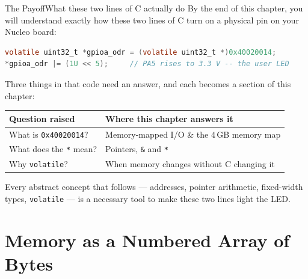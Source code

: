\documentclass[9pt,aspectratio=169,xcolor=table]{beamer}
\begin{document}
{\beamerextras
\begin{frame}[fragile]{The Payoff}{What these two lines of C actually do}
    \leavevmode
    By the end of this chapter, you will understand \alert{exactly} how these two lines of C turn on a physical pin on your Nucleo board:

    \vspace{3mm}
    \begin{center}
    \begin{minipage}{.92\textwidth}
\begin{lstlisting}[language=C, basicstyle=\ttfamily\small]
volatile uint32_t *gpioa_odr = (volatile uint32_t *)0x40020014;
*gpioa_odr |= (1U << 5);     // PA5 rises to 3.3 V -- the user LED
\end{lstlisting}
    \end{minipage}
    \end{center}

    \vspace{3mm}
    {\small Three things in that code need an answer, and each becomes a section of this chapter:}

    \vspace{1mm}
    \begin{center}
    {\small
    \striped
    \begin{tabular}{@{}l R{.56\textwidth}@{}}
        \toprule
        \textbf{Question raised} & \textbf{Where this chapter answers it} \\
        \midrule
        What is \texttt{0x40020014}? & Memory-mapped I/O \& the 4\,GB memory map \\
        What does the \texttt{*} mean? & Pointers, \texttt{\&} and \texttt{*} \\
        Why \texttt{volatile}? & When memory changes without C changing it \\
        \bottomrule
    \end{tabular}}
    \end{center}

    \vspace{1mm}
    {\small\centering Every abstract concept that follows --- addresses, pointer arithmetic, fixed-width types, \texttt{volatile} --- is a \alert{necessary tool} to make these two lines light the LED.\par}
\end{frame}
}


\section{Memory as a Numbered Array of Bytes}
\end{document}
